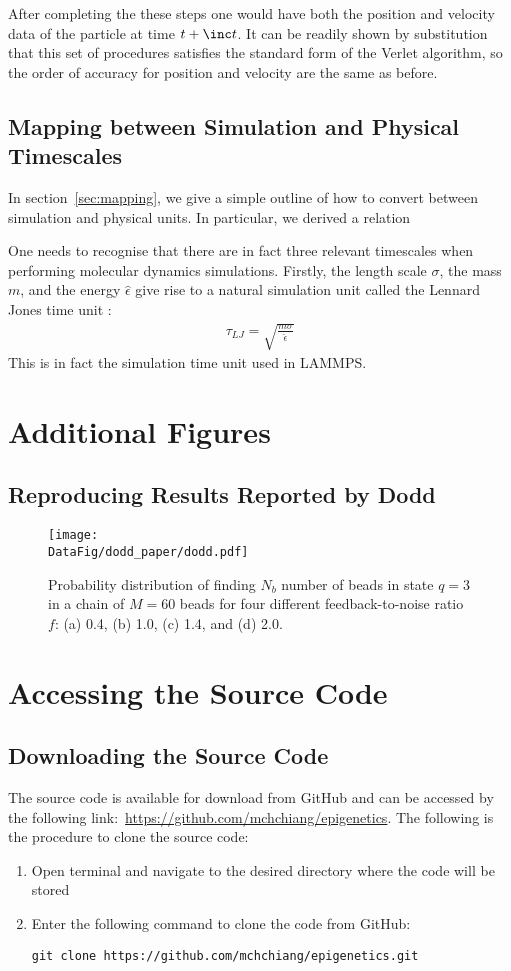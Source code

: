 After completing the these steps one would have both the position and velocity data of the particle at time $t + \inc t $. It can be readily shown by substitution that this set of procedures satisfies the standard form of the Verlet algorithm, so the order of accuracy for position and velocity are the same as before.  

\subsection{Mapping between Simulation and Physical Timescales}
\label{app:timescale}
In section~\ref{sec:mapping}, we give a simple outline of how to convert between simulation and physical units. In particular, we derived a relation 

One needs to recognise that there are in fact three relevant timescales when performing molecular dynamics simulations. Firstly, the length scale $\sigma$, the mass $m$, and the energy $\hat{\epsilon}$ give rise to a natural simulation unit called the Lennard Jones time unit :
\begin{eqnarray}
\tau_{LJ} = \sqrt{\frac{m\sigma}{\hat{\epsilon}}}
\end{eqnarray}
This is in fact the simulation time unit used in LAMMPS.

\section{Additional Figures}
\subsection{Reproducing Results Reported by Dodd \etal}
\label{app:doddresult}
\begin{figure}[h]
\centering
\texttt{[image: \\DataFig/dodd\_paper/dodd.pdf]}
\caption{Probability distribution of finding $N_b$ number of beads in state $q = 3$ in a chain of $M = 60$ beads for four different feedback-to-noise ratio $f$: (a) 0.4, (b) 1.0, (c) 1.4, and (d) 2.0.}
\label{fig:dodd}
\end{figure}
\FloatBarrier

\section{Accessing the Source Code}
\label{app:code}
\subsection{Downloading the Source Code}
The source code is available for download from GitHub and can be accessed by the following link:~\url{https://github.com/mchchiang/epigenetics}. The following is the procedure to clone the source code:
\begin{enumerate}
\item Open terminal and navigate to the desired directory where the code will be stored
\item Enter the following command to clone the code from GitHub:
\begin{lstlisting}
git clone https://github.com/mchchiang/epigenetics.git
\end{lstlisting}
\end{enumerate}

